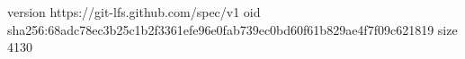 version https://git-lfs.github.com/spec/v1
oid sha256:68adc78ec3b25c1b2f3361efe96e0fab739ec0bd60f61b829ae4f7f09c621819
size 4130
